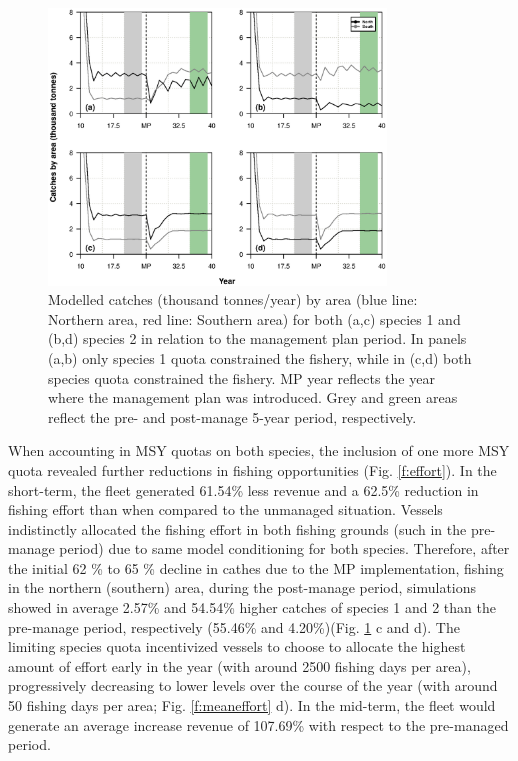 \documentclass[12pt,oneline,a4paper,numbib]{ouparticle}
\numberwithin{equation}{subsection} %
\begin{document}
\begin{figure}[!ht]
\centering
\includegraphics[width=0.8\textwidth]{Figures/Catchesbyarea.eps} 
\caption{Modelled catches (thousand tonnes/year) by area (blue line: Northern area, red line: Southern area) for both (a,c) species 1 and (b,d) species 2 in relation to the management plan period. In panels (a,b) only species 1 quota constrained the fishery, while in (c,d) both species quota constrained the fishery. MP year reflects the year where the management plan was introduced. Grey and green areas reflect the pre- and post-manage 5-year period, respectively.}
\label{f:catchesbyarea}
\end{figure} 

When accounting in MSY quotas on both species, the inclusion of one more MSY quota revealed further reductions in fishing opportunities (Fig. \ref{f:effort}). In the short-term, the fleet generated 61.54\% less revenue and a 62.5\% reduction in fishing effort than when compared to the unmanaged situation. Vessels indistinctly allocated the fishing effort in both fishing grounds (such in the pre-manage period) due to same model conditioning for both species. Therefore, after the initial 62 \% to 65 \% decline in cathes due to the MP implementation, fishing in the northern (southern) area, during the post-manage period, simulations showed in average 2.57\% and 54.54\% higher catches of species 1 and 2 than the pre-manage period, respectively (55.46\% and 4.20\%)(Fig. \ref{f:catchesbyarea} c and d). The limiting species quota incentivized vessels to choose to allocate the highest amount of effort early in the year (with around 2500 fishing days per area), progressively decreasing to lower levels over the course of the year (with around 50 fishing days per area; Fig. \ref{f:meaneffort} d). In the mid-term, the fleet would generate an average increase revenue of 107.69\% with respect to the pre-managed period. 
\end{document}

